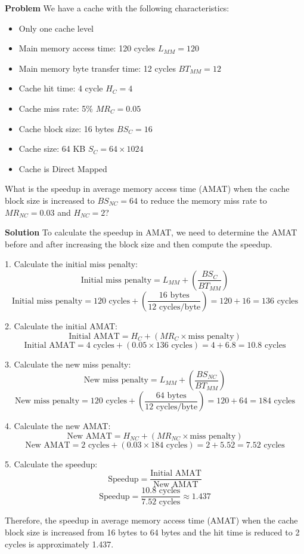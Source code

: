 \textbf{Problem}
We have a cache with the following characteristics:
\begin{itemize}
    \item Only one cache level
    \item Main memory access time: 120 cycles $L_{MM}=120$
    \item Main memory byte transfer time: 12 cycles $BT_{MM}=12$
    \item Cache hit time: 4 cycle $H_{C}=4$
    \item Cache miss rate: 5\% $MR_{C}=0.05$
    \item Cache block size: 16 bytes $BS_{C}=16$
    \item Cache size: 64 KB $S_{C}=64 \times 1024$
    \item Cache is Direct Mapped
\end{itemize}
What is the speedup in average memory access time (AMAT) when the cache block size is increased to $BS_{NC}=64$ to reduce the memory miss rate to $MR_{NC}=0.03$ and $H_{NC}=2$?

\textbf{Solution}
To calculate the speedup in AMAT, we need to determine the AMAT before and after increasing the block size and then compute the speedup.

1. Calculate the initial miss penalty:
\[
\text{Initial miss penalty} = L_{MM} + \left(\frac{BS_{C}}{BT_{MM}}\right)
\]
\[
\text{Initial miss penalty} = 120 \text{ cycles} + \left(\frac{16 \text{ bytes}}{12 \text{ cycles/byte}}\right) = 120 + 16 = 136 \text{ cycles}
\]

2. Calculate the initial AMAT:
\[
\text{Initial AMAT} = H_{C} + (MR_{C} \times \text{miss penalty})
\]
\[
\text{Initial AMAT} = 4 \text{ cycles} + (0.05 \times 136 \text{ cycles}) = 4 + 6.8 = 10.8 \text{ cycles}
\]

3. Calculate the new miss penalty:
\[
\text{New miss penalty} = L_{MM} + \left(\frac{BS_{NC}}{BT_{MM}}\right)
\]
\[
\text{New miss penalty} = 120 \text{ cycles} + \left(\frac{64 \text{ bytes}}{12 \text{ cycles/byte}}\right) = 120 + 64 = 184 \text{ cycles}
\]

4. Calculate the new AMAT:
\[
\text{New AMAT} = H_{NC} + (MR_{NC} \times \text{miss penalty})
\]
\[
\text{New AMAT} = 2 \text{ cycles} + (0.03 \times 184 \text{ cycles}) = 2 + 5.52 = 7.52 \text{ cycles}
\]

5. Calculate the speedup:
\[
\text{Speedup} = \frac{\text{Initial AMAT}}{\text{New AMAT}}
\]
\[
\text{Speedup} = \frac{10.8 \text{ cycles}}{7.52 \text{ cycles}} \approx 1.437
\]

Therefore, the speedup in average memory access time (AMAT) when the cache block size is increased from 16 bytes to 64 bytes and the hit time is reduced to 2 cycles is approximately 1.437.

